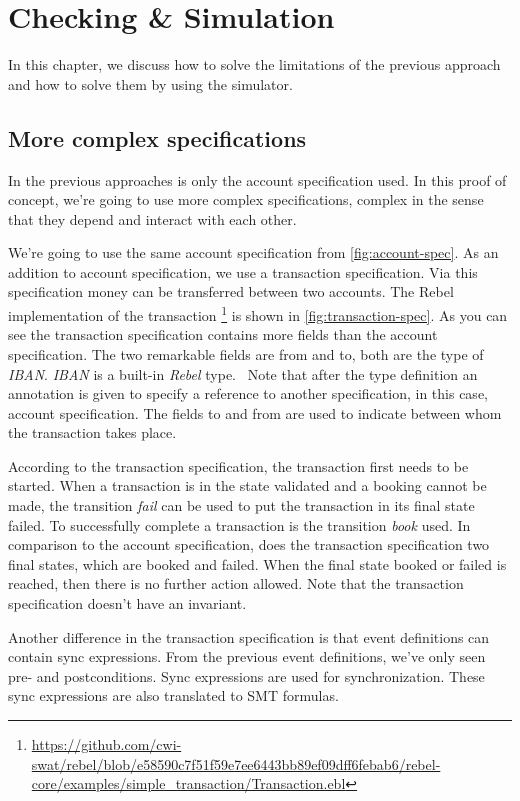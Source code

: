 \chapter{Checking \& Simulation}
\label{sec:ch5}

In this chapter, we discuss how to solve the limitations of the previous
approach and how to solve them by using the simulator.

\section{More complex specifications}
In the previous approaches is only the account specification used. In this proof
of concept, we're going to use more complex specifications, complex in the sense
that they depend and interact with each other.

We're going to use the
same account specification from \autoref{fig:account-spec}. As an addition to
account specification, we use a transaction specification. Via this
specification money can be transferred between two accounts.
The Rebel implementation of the transaction \footnote{\url{https://github.com/cwi-swat/rebel/blob/e58590c7f51f59e7ee6443bb89ef09dff6febab6/rebel-core/examples/simple_transaction/Transaction.ebl}} is shown in \autoref{fig:transaction-spec}.
As you can see the transaction specification contains more fields than the
account specification. The two remarkable fields are from and to, both are the
type of \textit{IBAN}. \textit{IBAN} is a built-in \textit{Rebel}
type.~\cite[p.~3]{stoel_storm_vinju_bosman_2016} Note that after the type
definition an annotation is given to specify a reference to another
specification, in this case, account specification. The fields to and from are
used to indicate between whom the transaction takes place.

According to the transaction specification, the transaction first
needs to be started. When a transaction is in the state validated and a booking
cannot be made, the transition \textit{fail} can be used to put the transaction in its
final state failed. To successfully complete a transaction is the transition
\textit{book} used. In comparison to the account specification, does the transaction
specification two final states, which are booked and failed. When the final
state booked or failed is reached, then there is no further action allowed.
Note that the transaction specification doesn't have an invariant.

Another difference in the transaction specification is that event definitions
can contain sync expressions. From the previous event definitions, we've only
seen pre- and postconditions. Sync expressions are used for synchronization.
These sync expressions are also translated to SMT formulas.

